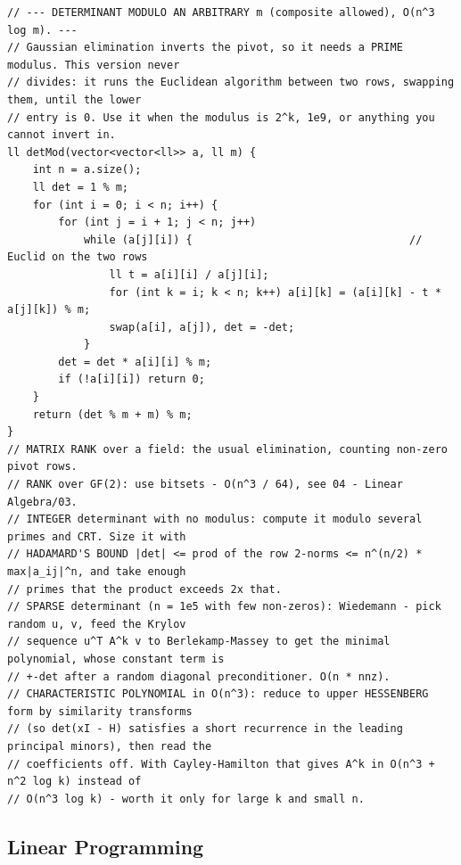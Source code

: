 \documentclass[9pt,a4paper,twocolumn]{extarticle}
\begin{document}
\begin{lstlisting}
// --- DETERMINANT MODULO AN ARBITRARY m (composite allowed), O(n^3 log m). ---
// Gaussian elimination inverts the pivot, so it needs a PRIME modulus. This version never
// divides: it runs the Euclidean algorithm between two rows, swapping them, until the lower
// entry is 0. Use it when the modulus is 2^k, 1e9, or anything you cannot invert in.
ll detMod(vector<vector<ll>> a, ll m) {
    int n = a.size();
    ll det = 1 % m;
    for (int i = 0; i < n; i++) {
        for (int j = i + 1; j < n; j++)
            while (a[j][i]) {                                  // Euclid on the two rows
                ll t = a[i][i] / a[j][i];
                for (int k = i; k < n; k++) a[i][k] = (a[i][k] - t * a[j][k]) % m;
                swap(a[i], a[j]), det = -det;
            }
        det = det * a[i][i] % m;
        if (!a[i][i]) return 0;
    }
    return (det % m + m) % m;
}
// MATRIX RANK over a field: the usual elimination, counting non-zero pivot rows.
// RANK over GF(2): use bitsets - O(n^3 / 64), see 04 - Linear Algebra/03.
// INTEGER determinant with no modulus: compute it modulo several primes and CRT. Size it with
// HADAMARD'S BOUND |det| <= prod of the row 2-norms <= n^(n/2) * max|a_ij|^n, and take enough
// primes that the product exceeds 2x that.
// SPARSE determinant (n = 1e5 with few non-zeros): Wiedemann - pick random u, v, feed the Krylov
// sequence u^T A^k v to Berlekamp-Massey to get the minimal polynomial, whose constant term is
// +-det after a random diagonal preconditioner. O(n * nnz).
// CHARACTERISTIC POLYNOMIAL in O(n^3): reduce to upper HESSENBERG form by similarity transforms
// (so det(xI - H) satisfies a short recurrence in the leading principal minors), then read the
// coefficients off. With Cayley-Hamilton that gives A^k in O(n^3 + n^2 log k) instead of
// O(n^3 log k) - worth it only for large k and small n.
\end{lstlisting}

\subsection{Linear Programming}

\filbreak
\end{document}
